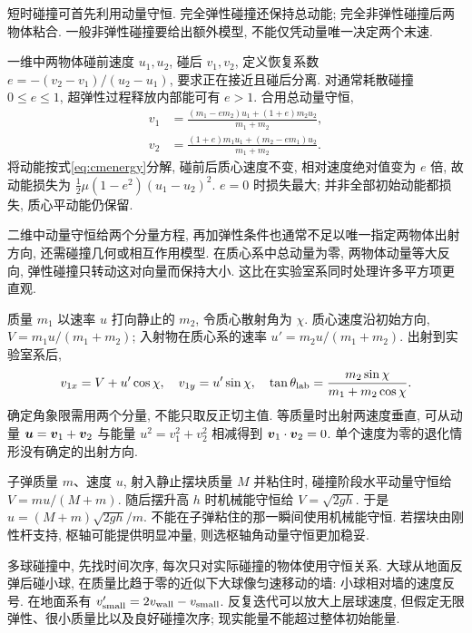 \label{ch:collision}
短时碰撞可首先利用动量守恒. 完全弹性碰撞还保持总动能; 完全非弹性碰撞后两物体粘合. 一般非弹性碰撞要给出额外模型, 不能仅凭动量唯一决定两个末速.

一维中两物体碰前速度 $u_1,u_2$, 碰后 $v_1,v_2$, 定义恢复系数 $e=-(v_2-v_1)/(u_2-u_1)$, 要求正在接近且碰后分离. 对通常耗散碰撞 $0\le e\le1$, 超弹性过程释放内部能可有 $e>1$. 合用总动量守恒,
\begin{align}
v_1&=\frac{(m_1-em_2)u_1+(1+e)m_2u_2}{m_1+m_2},\\
v_2&=\frac{(1+e)m_1u_1+(m_2-em_1)u_2}{m_1+m_2}.
\end{align}
将动能按式\eqref{eq:cmenergy}分解, 碰前后质心速度不变, 相对速度绝对值变为 $e$ 倍, 故动能损失为 $\frac12\mu(1-e^2)(u_1-u_2)^2$. $e=0$ 时损失最大; 并非全部初始动能都损失, 质心平动能仍保留.

二维中动量守恒给两个分量方程, 再加弹性条件也通常不足以唯一指定两物体出射方向, 还需碰撞几何或相互作用模型. 在质心系中总动量为零, 两物体动量等大反向, 弹性碰撞只转动这对向量而保持大小. 这比在实验室系同时处理许多平方项更直观.

质量 $m_1$ 以速率 $u$ 打向静止的 $m_2$, 令质心散射角为 $\chi$. 质心速度沿初始方向, $V=m_1u/(m_1+m_2)$; 入射物在质心系的速率 $u'=m_2u/(m_1+m_2)$. 出射到实验室系后,
\begin{equation}
v_{1x}=V+u'\cos\chi,\quad v_{1y}=u'\sin\chi,\quad
\tan\theta_{\rm lab}=\frac{m_2\sin\chi}{m_1+m_2\cos\chi}.
\end{equation}
确定角象限需用两个分量, 不能只取反正切主值. 等质量时出射两速度垂直, 可从动量 $\boldsymbol{u}=\boldsymbol{v}_1+\boldsymbol{v}_2$ 与能量 $u^2=v_1^2+v_2^2$ 相减得到 $\boldsymbol{v}_1\cdot\boldsymbol{v}_2=0$. 单个速度为零的退化情形没有确定的出射方向.

子弹质量 $m$、速度 $u$, 射入静止摆块质量 $M$ 并粘住时, 碰撞阶段水平动量守恒给 $V=mu/(M+m)$. 随后摆升高 $h$ 时机械能守恒给 $V=\sqrt{2gh}$. 于是 $u=(M+m)\sqrt{2gh}/m$. 不能在子弹粘住的那一瞬间使用机械能守恒. 若摆块由刚性杆支持, 枢轴可能提供明显冲量, 则选枢轴角动量守恒更加稳妥.

多球碰撞中, 先找时间次序, 每次只对实际碰撞的物体使用守恒关系. 大球从地面反弹后碰小球, 在质量比趋于零的近似下大球像匀速移动的墙: 小球相对墙的速度反号. 在地面系有 $v'_{\rm small}=2v_{\rm wall}-v_{\rm small}$. 反复迭代可以放大上层球速度, 但假定无限弹性、很小质量比以及良好碰撞次序; 现实能量不能超过整体初始能量.
